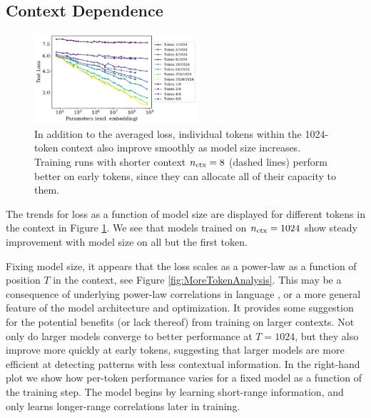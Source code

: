 \documentclass[english]{article}
\begin{document}
\subsection{Context Dependence}
\label{sec:ContextDependence}

\begin{figure}
\noindent \centering{}  \includegraphics[width=0.54\textwidth]{PerformancevsModelSizevsContext}  \caption[Performance at different context positions versus model size]{In addition to the averaged loss, individual tokens within the 1024-token context also improve smoothly as model size increases.  Training runs with shorter context $n_{\rm ctx} = 8$ (dashed lines) perform better on early tokens, since they can allocate all of their capacity to them.  \label{fig:PerformancevsModelSizevsContext}}
\end{figure}




The trends for loss as a function of model size are displayed for different tokens in the context in Figure \ref{fig:PerformancevsModelSizevsContext}.  We see that models trained on $n_{\rm ctx} = 1024$ show steady improvement with model size on all but the first token.  

Fixing model size, it appears that the loss scales as a power-law as a function of position $T$ in the context, see Figure \ref{fig:MoreTokenAnalysis}.  This may be a consequence of underlying power-law correlations in language \cite{ebeling1994entropy, altmann2012origin, lin2016criticality}, or a more general feature of the model architecture and optimization.  It provides some suggestion for the potential benefits (or lack thereof) from training on larger contexts.  Not only do larger models converge to better performance at $T=1024$, but they also improve more quickly at early tokens, suggesting that larger models are more efficient at detecting patterns with less contextual information.  In the right-hand plot we show how per-token performance varies for a fixed model as a function of the training step.  The model begins by learning short-range information, and only learns longer-range correlations later in training.   
\end{document}
